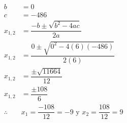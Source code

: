 \begin{solutionbox}{11cm}
\begin{multicols}{2}
\[\begin{array}{rl}
                b          & =0                                                          \\
                c          & =-486                                                       \\
                x_{1,2}    & = \dfrac{-b\pm\sqrt{b^2-4ac}}{2a}                           \\[2em]
                x_{1,2}    & = \dfrac{0\pm\sqrt{0^2-4(6)(-486)}}{2(6)}                   \\[2em]
                x_{1,2}    & = \dfrac{\pm\sqrt{11664}}{12}                               \\[2em]
                x_{1,2}    & = \dfrac{\pm108}{6}                                         \\[2em]
                \therefore & x_1 =\dfrac{-108}{12}=-9 \text{ y }  x_2 =\dfrac{108}{12}=9 \\[2em]
            \end{array}
        \]
    \end{multicols}
\end{solutionbox}
